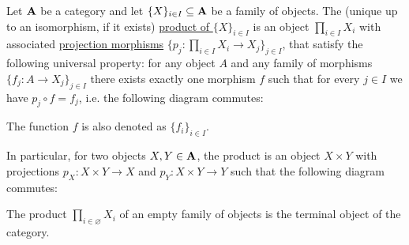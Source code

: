 \begin{definition}\label{def:category_product}\cite[definition 5.1.1]{Leinster2014}
  Let $\operatorname{\mathbf{A}}$ be a category and let $\{ X \}_{i \in I} \subseteq \operatorname{\mathbf{A}}$ be a family of objects. The (unique up to an isomorphism, if it exists) \uline{product of $\{ X \}_{i \in I}$} is an object $\prod_{i \in I} X_i$ with associated \uline{projection morphisms} $\{ p_j: \prod_{i \in I} X_i \to X_j \}_{j \in I}$, that satisfy the following universal property: for any object $A$ and any family of morphisms $\{ f_j: A \to {X_j} \}_{j \in I}$ there exists exactly one morphism $f$ such that for every $j \in I$ we have $p_j \circ f = f_j$, i.e. the following diagram commutes:
  \begin{center}
  \end{center}

  The function $f$ is also denoted as $\{ f_i \}_{i \in I}$.

  In particular, for two objects $X, Y \in \operatorname{\mathbf{A}}$, the product is an object $X \times Y$ with projections $p_X: X \times Y \to X$ and $p_Y: X \times Y \to Y$ such that the following diagram commutes:
  \begin{center}
  \end{center}
\end{definition}

\begin{note}
  The product $\prod_{i \in \varnothing} X_i$ of an empty family of objects is the terminal object of the category.
\end{note}
